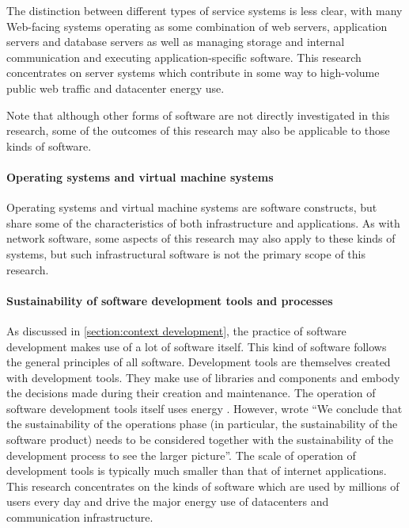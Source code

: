 The distinction between different types of service systems is less clear, with many Web-facing systems operating as some combination of web servers, application servers and database servers as well as managing storage and internal communication and executing application-specific software. This research concentrates on server systems which contribute in some way to high-volume public web traffic and datacenter energy use.

Note that although other forms of software are not directly investigated in this research, some of the outcomes of this research may also be applicable to those kinds of software.

\paragraph{Operating systems and virtual machine systems}

Operating systems and virtual machine systems are software constructs, but share some of the characteristics of both infrastructure and applications. As with network software, some aspects of this research may also apply to these kinds of systems, but such infrastructural software is not the primary scope of this research.

\paragraph{Sustainability of software development tools and processes}

As discussed in \autoref{section:context development}, the practice of software development makes use of a lot of software itself. This kind of software follows the general principles of all software. Development tools are themselves created with development tools. They make use of libraries and components and embody the decisions made during their creation and maintenance. The operation of software development tools itself uses energy \citep{Zaidman2024}. However, \citet{Wahler2024} wrote \enquote{We conclude that the sustainability of the operations phase (in particular, the sustainability of the software product) needs to be considered together with the sustainability of the development process to see the larger picture}. The scale of operation of development tools is typically much smaller than that of internet applications. This research concentrates on the kinds of software which are used by millions of users every day and drive the major energy use of datacenters and communication infrastructure.

